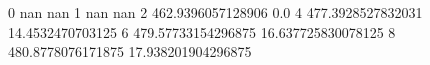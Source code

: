 0 nan nan
1 nan nan
2 462.9396057128906 0.0
4 477.3928527832031 14.4532470703125
6 479.57733154296875 16.637725830078125
8 480.8778076171875 17.938201904296875
